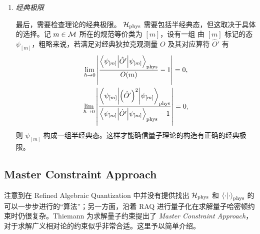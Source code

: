\begin{enumerate}
			\item \emph{经典极限}
			
					最后，需要检查理论的经典极限。 $\mathcal{H}_{\text{phys}}$ 需要包括半经典态，但这取决于具体的选择。记 $m\in \mathcal{M}$ 所在的规范等价类为 $[m]$，设有一组 由 $[m]$ 标记的态 $\psi_{[m]}$，粗略来说，若满足对经典狄拉克观测量 $O$ 及其对应算符 $\hat{O}'$ 有
					\begin{gather}
						\lim_{\hbar \rightarrow 0} \abs{\frac{\ev**{\hat{O}'}{\psi_{[m]}}_{\text{phys}}}{O(m)} - 1} = 0,\\
						\lim_{\hbar \rightarrow 0} \abs{\frac{\ev**{\left( \hat{O}^\prime \right)^2}{\psi_{[m]}}_{\text{phys}}}{\ev**{\hat{O}^\prime}{\psi_{[m]}}_{\text{phys}} - 1}} = 0,
					\end{gather}
					则 $\psi_{[m]}$ 构成一组半经典态。这样才能确信量子理论的构造有正确的经典极限。
		\end{enumerate}

	\subsection{Master Constraint Approach}
		注意到在 Refined Algebraic Quantization 中并没有提供找出 $\mathcal{H}_{\text{phys}}$ 和 $\ip{\cdot}_{\text{phys}}$ 的可以一步步进行的“算法”；另一方面，沿着 RAQ 进行量子化在求解量子哈密顿约束时仍很复杂。Thiemann 为求解量子约束提出了 \emph{Master Constraint Approach}，对于求解广义相对论的约束似乎非常合适\cite{Thiemann2003zv}。这里予以简单介绍。


